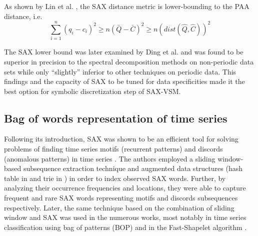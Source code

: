 As shown by Lin et al. \cite{sax}, the SAX distance metric is lower-bounding to the PAA distance, i.e.
\begin{equation}
\sum_{i=1}^{n} (q_{i} - c_{i})^{2} \geq n(\bar{Q} - \bar{C})^{2} \geq n(dist(\hat{Q},\hat{C}))^2
\label{eq:sax_bounding}
\end{equation}

The SAX lower bound was later examined by Ding et al. \cite{citeulike:4501572} and was found to be 
superior in precision to the spectral decomposition methods on non-periodic data sets while only
``slightly'' inferior to other techniques on periodic data. This findings and the capacity of SAX to be
tuned for data specificities made it the best option for symbolic discretization step of SAX-VSM.

%

\subsection{Bag of words representation of time series}\label{bow_representation}
Following its introduction, SAX was shown to be an efficient tool for solving problems 
of finding time series motifs (recurrent patterns) and discords (anomalous patterns) 
in time series \cite{citeulike:3977965, citeulike:3175749}. 
The authors employed a sliding window-based subsequence extraction technique 
and augmented data structures (hash table in \cite{citeulike:3977965} and trie in \cite{citeulike:3175749}) 
in order to index observed SAX words. Further, by analyzing their occurrence frequencies and locations, 
they were able to capture frequent and rare SAX words representing motifs and discords subsequences respectively. 
Later, the same technique based on the combination of sliding window and SAX was used in 
the numerous works, most notably in time series classification using bag of patterns 
(BOP) \cite{citeulike:10525778} and in the Fast-Shapelet algorithm \cite{citeulike:12563493}. 


